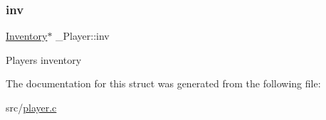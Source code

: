 \subsubsection{\texorpdfstring{inv}{inv}}
{\footnotesize\ttfamily \hyperlink{struct__Inventory}{Inventory}$\ast$ \+\_\+\+Player\+::inv}

Player\textquotesingle{}s inventory 

The documentation for this struct was generated from the following file\+:\begin{DoxyCompactItemize}
\item 
src/\hyperlink{player_8c}{player.\+c}\end{DoxyCompactItemize}
